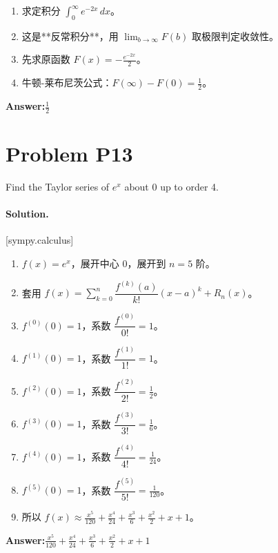 \documentclass[11pt,a4paper]{ctexart}
\newcommand{\solvertag}[1]{{\footnotesize\color{gray}\textsf{[#1]}}}
\begin{document}
\begin{enumerate}[leftmargin=*]
  \item 求定积分 $\displaystyle\int_{0}^{\infty} e^{- 2 x}\, dx$。
  \item 这是**反常积分**，用 $\lim_{b\to\infty}F(b)$ 取极限判定收敛性。
  \item 先求原函数 $F(x) = - \frac{e^{- 2 x}}{2}$。
  \item 牛顿-莱布尼茨公式：$F(\infty) - F(0) = \frac{1}{2}$。
\end{enumerate}

\noindent\textbf{Answer:}\quad $\frac{1}{2}$

\medskip

\section*{Problem P13}
Find the Taylor series of $e^{x}$ about 0 up to order 4.

\paragraph{Solution.} \solvertag{sympy.calculus} 

\begin{enumerate}[leftmargin=*]
  \item $f(x) = e^{x}$，展开中心 $0$，展开到 $n=5$ 阶。
  \item 套用 $f(x) = \sum_{k=0}^{n} \dfrac{f^{(k)}(a)}{k!}(x-a)^k + R_n(x)$。
  \item $f^{(0)}(0) = 1$，系数 $\dfrac{f^{(0)}}{0!} = 1$。
  \item $f^{(1)}(0) = 1$，系数 $\dfrac{f^{(1)}}{1!} = 1$。
  \item $f^{(2)}(0) = 1$，系数 $\dfrac{f^{(2)}}{2!} = \frac{1}{2}$。
  \item $f^{(3)}(0) = 1$，系数 $\dfrac{f^{(3)}}{3!} = \frac{1}{6}$。
  \item $f^{(4)}(0) = 1$，系数 $\dfrac{f^{(4)}}{4!} = \frac{1}{24}$。
  \item $f^{(5)}(0) = 1$，系数 $\dfrac{f^{(5)}}{5!} = \frac{1}{120}$。
  \item 所以 $f(x) \approx \frac{x^{5}}{120} + \frac{x^{4}}{24} + \frac{x^{3}}{6} + \frac{x^{2}}{2} + x + 1$。
\end{enumerate}

\noindent\textbf{Answer:}\quad $\frac{x^{5}}{120} + \frac{x^{4}}{24} + \frac{x^{3}}{6} + \frac{x^{2}}{2} + x + 1$

\medskip
\end{document}
